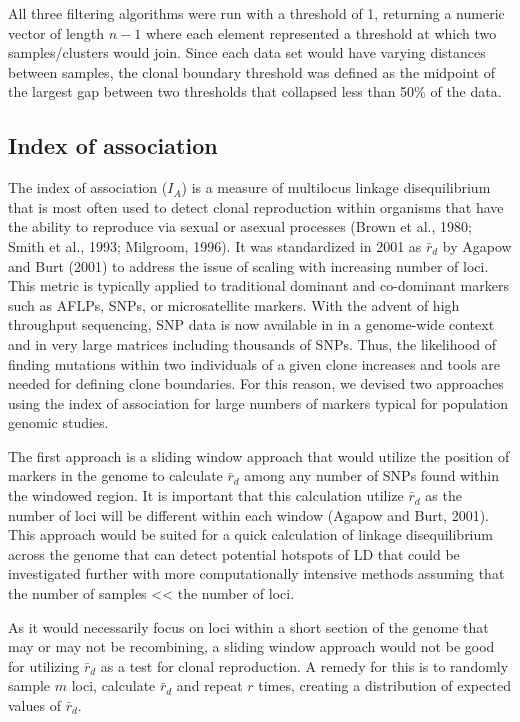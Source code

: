 \documentclass{frontiersSCNS} %
\begin{document}
All three filtering algorithms were run with a threshold of 1, returning
a numeric vector of length \(n - 1\) where each element represented a
threshold at which two samples/clusters would join. Since each data set
would have varying distances between samples, the clonal boundary
threshold was defined as the midpoint of the largest gap between two
thresholds that collapsed less than 50\% of the data.

\subsection*{Index of association}\label{index-of-association}

The index of association (\(I_A\)) is a measure of multilocus linkage
disequilibrium that is most often used to detect clonal reproduction
within organisms that have the ability to reproduce via sexual or
asexual processes (Brown et al., 1980; Smith et al., 1993; Milgroom,
1996). It was standardized in 2001 as \(\bar{r}_d\) by Agapow and Burt
(2001) to address the issue of scaling with increasing number of loci.
This metric is typically applied to traditional dominant and co-dominant
markers such as AFLPs, SNPs, or microsatellite markers. With the advent
of high throughput sequencing, SNP data is now available in in a
genome-wide context and in very large matrices including thousands of
SNPs. Thus, the likelihood of finding mutations within two individuals
of a given clone increases and tools are needed for defining clone
boundaries. For this reason, we devised two approaches using the index
of association for large numbers of markers typical for population
genomic studies.

The first approach is a sliding window approach that would utilize the
position of markers in the genome to calculate \(\bar{r}_d\) among any
number of SNPs found within the windowed region. It is important that
this calculation utilize \(\bar{r}_d\) as the number of loci will be
different within each window (Agapow and Burt, 2001). This approach
would be suited for a quick calculation of linkage disequilibrium across
the genome that can detect potential hotspots of LD that could be
investigated further with more computationally intensive methods
assuming that the number of samples \textless{}\textless{} the number of
loci.

As it would necessarily focus on loci within a short section of the
genome that may or may not be recombining, a sliding window approach
would not be good for utilizing \(\bar{r}_d\) as a test for clonal
reproduction. A remedy for this is to randomly sample \(m\) loci,
calculate \(\bar{r}_d\) and repeat \(r\) times, creating a distribution
of expected values of \(\bar{r}_d\).
\end{document}
